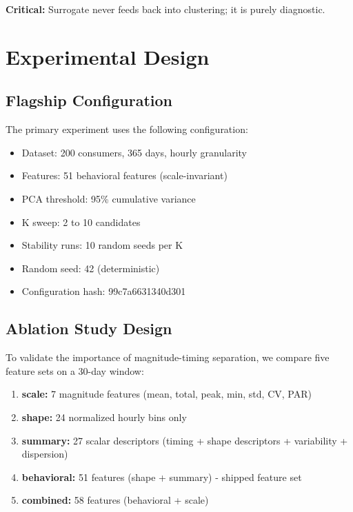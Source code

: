 \documentclass[11pt,a4paper]{article}
\begin{document}
\textbf{Critical:} Surrogate never feeds back into clustering; it is purely diagnostic.

\section{Experimental Design}
\label{sec:experiments}

\subsection{Flagship Configuration}

The primary experiment uses the following configuration:

\begin{itemize}
    \item Dataset: 200 consumers, 365 days, hourly granularity
    \item Features: 51 behavioral features (scale-invariant)
    \item PCA threshold: 95\% cumulative variance
    \item K sweep: 2 to 10 candidates
    \item Stability runs: 10 random seeds per K
    \item Random seed: 42 (deterministic)
    \item Configuration hash: 99c7a6631340d301
\end{itemize}

\subsection{Ablation Study Design}

To validate the importance of magnitude-timing separation, we compare five feature sets on a 30-day window:

\begin{enumerate}
    \item \textbf{scale:} 7 magnitude features (mean, total, peak, min, std, CV, PAR)
    \item \textbf{shape:} 24 normalized hourly bins only
    \item \textbf{summary:} 27 scalar descriptors (timing + shape descriptors + variability + dispersion)
    \item \textbf{behavioral:} 51 features (shape + summary) - shipped feature set
    \item \textbf{combined:} 58 features (behavioral + scale)
\end{enumerate}
\end{document}
